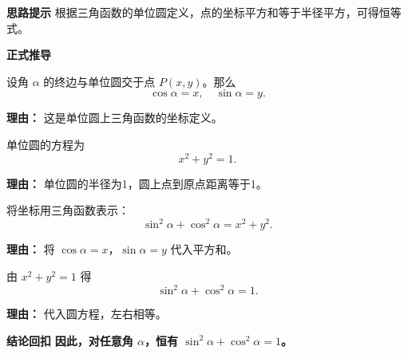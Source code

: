\begin{proofbox}
	\textbf{\textcolor{CProof}{思路提示}}
	根据三角函数的单位圆定义，点的坐标平方和等于半径平方，可得恒等式。

	\medskip
	\textbf{\textcolor{CProof}{正式推导}}
	\begin{description}[style=nextline, leftmargin=2.8em, labelsep=0.5em, itemsep=0.55em]
		\item[\textbf{步骤一（单位圆设定）：}]
			设角 $\alpha$ 的终边与单位圆交于点 $P(x,y)$。那么
			\[
				\cos\alpha = x,\quad \sin\alpha = y.
			\]
			\par\textbf{理由：} 这是单位圆上三角函数的坐标定义。
		\item[\textbf{步骤二（圆方程）：}]
			单位圆的方程为
			\[
				x^2 + y^2 = 1.
			\]
			\par\textbf{理由：} 单位圆的半径为1，圆上点到原点距离等于1。
		\item[\textbf{步骤三（代入代换）：}]
			将坐标用三角函数表示：
			\[
				\sin^2\alpha + \cos^2\alpha = x^2 + y^2.
			\]
			\par\textbf{理由：} 将 $\cos\alpha = x$，$\sin\alpha = y$ 代入平方和。
		\item[\textbf{步骤四（恒等结论）：}]
			由 $x^2+y^2=1$ 得
			\[
				\sin^2\alpha + \cos^2\alpha = 1.
			\]
			\par\textbf{理由：} 代入圆方程，左右相等。
	\end{description}

	\medskip
	\textbf{\textcolor{CProof}{结论回扣}}
	\textbf{因此，对任意角 $\alpha$，恒有 $\sin^2\alpha + \cos^2\alpha = 1$。}
\end{proofbox}
